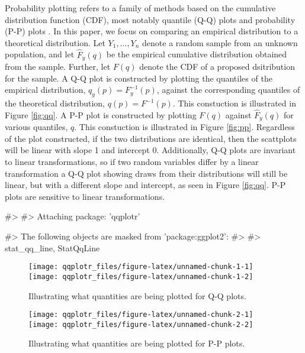 Probability plotting refers to a family of methods based on the
cumulative distribution function (CDF), most notably quantile (Q-Q)
plots and probability (P-P) plots \citep{Wilk1968-ii}. In this paper, we
focus on comparing an empirical distribution to a theoretical
distribution. Let \(Y_1, \ldots, Y_n\) denote a random sample from an
unknown population, and let \(\widehat{F}_y(q)\) be the empirical
cumulative distribution obtained from the sample. Further, let \(F(q)\)
denote the CDF of a proposed dsitribution for the sample. A Q-Q plot is
constructed by plotting the quantiles of the empirical distribution,
\(q_y(p) = F_y^{-1}(p)\), against the corresponding quantiles of the
theoretical distribution, \(q(p) = F^{-1}(p)\). This constuction is
illustrated in Figure \ref{fig:qq}. A P-P plot is constructed by
plotting \(F(q)\) against \(\widehat{F}_y(q)\) for various quantiles,
\(q\). This constuction is illustrated in Figure \ref{fig:pp}.
Regardless of the plot constructed, if the two distributions are
identical, then the scattplots will be linear with slope 1 and intercept
0. Additionally, Q-Q plots are invariant to linear transformations, so
if two random variables differ by a linear transformation a Q-Q plot
showing draws from their distributions will still be linear, but with a
different slope and intercept, as seen in Figure \ref{fig:qq}. P-P plots
are sensitive to linear transformations.

\begin{Schunk}
\begin{Soutput}
#> 
#> Attaching package: 'qqplotr'
\end{Soutput}
\begin{Soutput}
#> The following objects are masked from 'package:ggplot2':
#> 
#>     stat_qq_line, StatQqLine
\end{Soutput}
\begin{figure}

{\centering \texttt{[image: qqplotr\_files/figure-latex/unnamed-chunk-1-1]} \texttt{[image: qqplotr\_files/figure-latex/unnamed-chunk-1-2]} 

}

\caption{\label{fig:qq}Illustrating what quantities are being plotted for Q-Q plots.}\label{fig:unnamed-chunk-1}
\end{figure}
\end{Schunk}

\begin{Schunk}
\begin{figure}

{\centering \texttt{[image: qqplotr\_files/figure-latex/unnamed-chunk-2-1]} \texttt{[image: qqplotr\_files/figure-latex/unnamed-chunk-2-2]} 

}

\caption{\label{fig:pp}Illustrating what quantities are being plotted for P-P plots.}\label{fig:unnamed-chunk-2}
\end{figure}
\end{Schunk}

